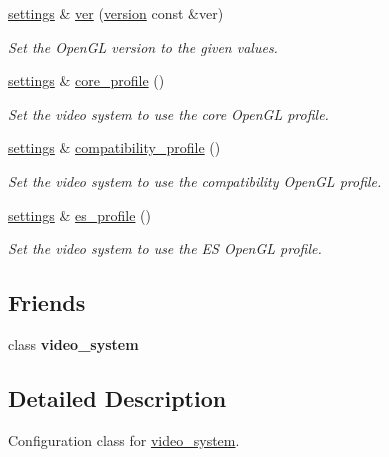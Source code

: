 \begin{DoxyCompactItemize}
\hyperlink{classgfx_1_1video__system_1_1settings}{settings} \& \hyperlink{classgfx_1_1video__system_1_1settings_add121587f4a6510390ec102fdb6f1d82}{ver} (\hyperlink{classgfx_1_1version}{version} const \&ver)
\begin{DoxyCompactList}\small\item\em Set the Open\-G\-L version to the given values. \end{DoxyCompactList}\item 
\hyperlink{classgfx_1_1video__system_1_1settings}{settings} \& \hyperlink{classgfx_1_1video__system_1_1settings_a8eb561a87de6c5268aeea6ad0c942a7a}{core\-\_\-profile} ()
\begin{DoxyCompactList}\small\item\em Set the video system to use the core Open\-G\-L profile. \end{DoxyCompactList}\item 
\hyperlink{classgfx_1_1video__system_1_1settings}{settings} \& \hyperlink{classgfx_1_1video__system_1_1settings_a5f8cdce3920df80ff413976b5ce74da1}{compatibility\-\_\-profile} ()
\begin{DoxyCompactList}\small\item\em Set the video system to use the compatibility Open\-G\-L profile. \end{DoxyCompactList}\item 
\hyperlink{classgfx_1_1video__system_1_1settings}{settings} \& \hyperlink{classgfx_1_1video__system_1_1settings_a2a7f92421494055d3a88f4151276bfe6}{es\-\_\-profile} ()
\begin{DoxyCompactList}\small\item\em Set the video system to use the E\-S Open\-G\-L profile. \end{DoxyCompactList}\end{DoxyCompactItemize}
\subsection*{Friends}
\begin{DoxyCompactItemize}
\item 
\hypertarget{classgfx_1_1video__system_1_1settings_abfd69a86b028655cf7807981b1c58526}{class {\bfseries video\-\_\-system}}\label{classgfx_1_1video__system_1_1settings_abfd69a86b028655cf7807981b1c58526}

\end{DoxyCompactItemize}


\subsection{Detailed Description}
Configuration class for \hyperlink{classgfx_1_1video__system}{video\-\_\-system}. 


